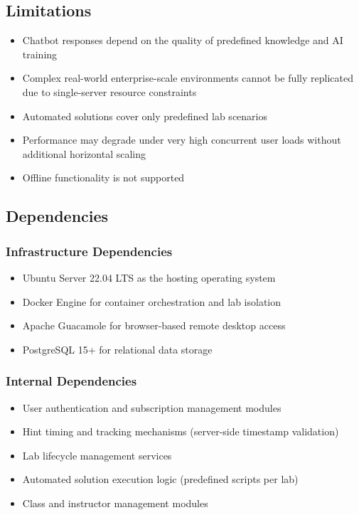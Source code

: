 \documentclass[12pt,a4paper]{report}
\begin{document}
\subsection{Limitations}
\begin{itemize}
  \item Chatbot responses depend on the quality of predefined knowledge and AI training
  \item Complex real-world enterprise-scale environments cannot be fully replicated due to single-server resource constraints
  \item Automated solutions cover only predefined lab scenarios
  \item Performance may degrade under very high concurrent user loads without additional horizontal scaling
  \item Offline functionality is not supported
\end{itemize}

\subsection{Dependencies}

\subsubsection{Infrastructure Dependencies}
\begin{itemize}
  \item Ubuntu Server 22.04 LTS as the hosting operating system
  \item Docker Engine for container orchestration and lab isolation
  \item Apache Guacamole for browser-based remote desktop access
  \item PostgreSQL 15+ for relational data storage
\end{itemize}

\subsubsection{Internal Dependencies}
\begin{itemize}
  \item User authentication and subscription management modules
  \item Hint timing and tracking mechanisms (server-side timestamp validation)
  \item Lab lifecycle management services
  \item Automated solution execution logic (predefined scripts per lab)
  \item Class and instructor management modules
\end{itemize}
\end{document}
